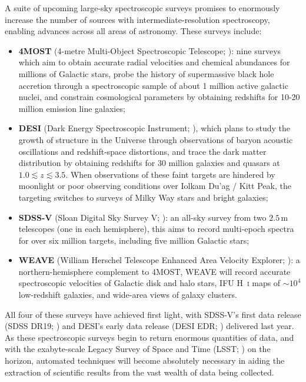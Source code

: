 \documentclass[fleqn,usenatbib]{mnras}
\begin{document}
A suite of upcoming large-sky spectroscopic surveys promises to enormously increase the number of sources with intermediate-resolution spectroscopy, enabling advances across all areas of astronomy.
These surveys include:
\begin{itemize}
\item
\textbf{4MOST}
(4-metre Multi-Object Spectroscopic Telescope; \citealt{4most}): nine surveys which aim to obtain accurate radial velocities and chemical abundances for millions of Galactic stars, probe the history of supermassive black hole accretion through a spectroscopic sample of about 1 million active galactic nuclei, and constrain cosmological parameters by obtaining redshifts for 10-20 million emission line galaxies;
\item
\textbf{DESI}
(Dark Energy Spectroscopic Instrument; \citealt{desii, desiii}), which plans to study the growth of structure in the Universe through observations of baryon acoustic oscillations and redshift-space distortions, and trace the dark matter distribution by obtaining redshifts for 30 million galaxies and quasars at $1.0\lesssim z \lesssim 3.5$.
When observations of these faint targets are hindered by moonlight or poor observing conditions over Iolkam Du'ag / Kitt Peak, the targeting switches to surveys of Milky Way stars and bright galaxies;
\item
\textbf{SDSS-V}
(Sloan Digital Sky Survey V; \citealt{sdssv}):
an all-sky survey from two $2.5\,\text{m}$ telescopes (one in each hemisphere), this aims to record multi-epoch spectra for over six million targets, including five million Galactic stars;
\item
\textbf{WEAVE}
(William Herschel Telescope Enhanced Area Velocity Explorer; \citealt{weave}): a northern-hemisphere complement to 4MOST, WEAVE will record accurate spectroscopic velocities of Galactic disk and halo stars, IFU H~\textsc{i} maps of $\sim10^4$ low-redshift galaxies, and wide-area views of galaxy clusters.
\end{itemize}
All four of these surveys have achieved first light, with SDSS-V's first data release (SDSS DR19; \citealt{sdssdr19}) and DESI's early data release (DESI EDR; \citealt{desiedr}) delivered last year.
As these spectroscopic surveys begin to return enormous quantities of data, and with the exabyte-scale Legacy Survey of Space and Time (LSST; \citealt{lsst}) on the horizon, automated techniques will become absolutely necessary in aiding the extraction of scientific results from the vast wealth of data being collected.
\end{document}
